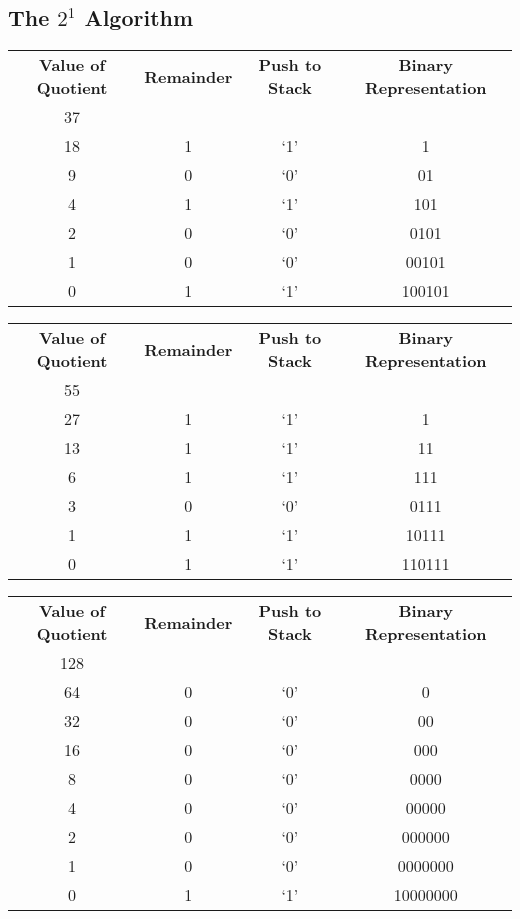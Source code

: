 \documentclass[12pt]{article}
\begin{document}
\subsection{The $2^1$ Algorithm}
\begin{center}
  \begin{tabular}{c|c|c|c}
    \textbf{Value of Quotient} & \textbf{Remainder} & \textbf{Push to Stack} & \textbf{Binary Representation} \\
    37 &   &     & \\
    18 & 1 & `1' & 1 \\
    9  & 0 & `0' & 01 \\
    4  & 1 & `1' & 101 \\
    2  & 0 & `0' & 0101 \\
    1  & 0 & `0' & 00101 \\
    0  & 1 & `1' & 100101
  \end{tabular}
\end{center}

\begin{center}
  \begin{tabular}{c|c|c|c}
    \textbf{Value of Quotient} & \textbf{Remainder} & \textbf{Push to Stack} & \textbf{Binary Representation} \\
    55 &   &     & \\
    27 & 1 & `1' & 1 \\
    13 & 1 & `1' & 11 \\
    6  & 1 & `1' & 111 \\
    3  & 0 & `0' & 0111 \\
    1  & 1 & `1' & 10111 \\
    0  & 1 & `1' & 110111
  \end{tabular}
\end{center}

\begin{center}
  \begin{tabular}{c|c|c|c}
    \textbf{Value of Quotient} & \textbf{Remainder} & \textbf{Push to Stack} & \textbf{Binary Representation} \\
    128 &   &     & \\
    64  & 0 & `0' & 0 \\
    32  & 0 & `0' & 00 \\
    16  & 0 & `0' & 000 \\
    8   & 0 & `0' & 0000 \\
    4   & 0 & `0' & 00000 \\
    2   & 0 & `0' & 000000 \\
    1   & 0 & `0' & 0000000 \\
    0   & 1 & `1' & 10000000
  \end{tabular}
\end{center}
\end{document}

